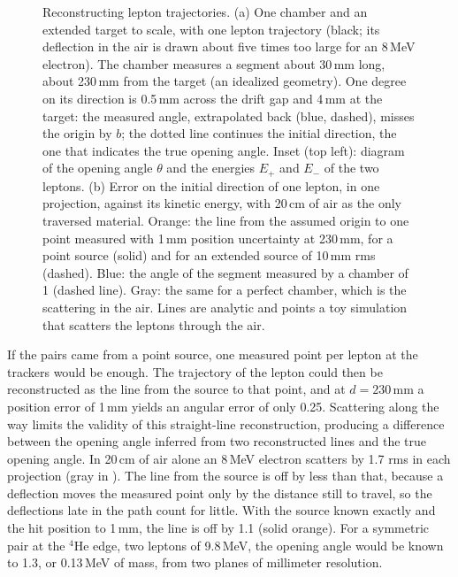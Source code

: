 \begin{figure}[tbp]
  \centering
  \caption{Reconstructing lepton trajectories. (a) One chamber and an extended target to scale, with one lepton trajectory (black; its
  deflection in the air is drawn about five times too large for an 8\,MeV electron). The chamber measures a segment
  about 30\,mm long, about 230\,mm from the target (an idealized geometry). One degree on its direction is 0.5\,mm
  across the drift gap and 4\,mm at the target: the measured angle, extrapolated back (blue, dashed), misses the
  origin by $b$; the dotted line continues the initial direction, the one that indicates the true opening angle. Inset (top left): diagram of the opening angle $\theta$ and the energies $E_+$ and
  $E_-$ of the two leptons. (b) Error on the initial
  direction of one lepton, in one projection, against its kinetic energy, with 20\,cm of air as the only traversed material.
  Orange: the line from the assumed origin to one point measured with 1\,mm position uncertainty at 230\,mm, for a point source (solid) and for an extended source of
  10\,mm rms (dashed). Blue: the angle of the segment measured by a chamber of 1\textdegree{} (dashed line). Gray: the
  same for a perfect chamber, which is the scattering in the air. Lines are analytic and points a toy simulation that
  scatters the leptons through the air.}
  \label{fig:pointing}
\end{figure}

If the pairs came from a point source, one measured point per lepton at the trackers would be enough. The trajectory of the lepton could then be reconstructed as the line from the source to that point, and at $d=230$\,mm a position error of 1\,mm yields an angular error of only 0.25\textdegree. Scattering along the way limits the validity of this straight-line reconstruction, producing a difference between the opening angle inferred from two reconstructed lines and the true opening angle. In 20\,cm of air alone an 8\,MeV electron scatters by 1.7\textdegree{} rms in each projection
(gray in ). The line from the source is off by less than that, because a deflection moves the measured point only by the distance still to travel, so the deflections late in the path count for little. With the source known exactly and the hit position to 1\,mm, the line is off by 1.1\textdegree{} (solid orange). For a symmetric pair at the $^4$He edge, two leptons of 9.8\,MeV, the opening angle would
be known to 1.3\textdegree, or 0.13\,MeV of mass, from two planes of millimeter resolution.

